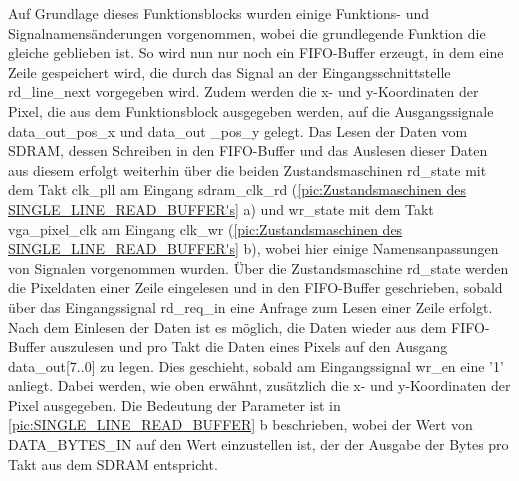 \documentclass[ngerman,12pt]{article} %
\begin{document}
{Auf Grundlage dieses Funktionsblocks wurden einige Funktions- und Signalnamensänderungen vorgenommen, wobei die grundlegende Funktion die gleiche geblieben ist. So wird nun nur noch ein FIFO-Buffer erzeugt, in dem eine Zeile gespeichert wird, die durch das Signal an der Eingangsschnittstelle rd\_line\_next vorgegeben wird. Zudem werden die x- und y-Koordinaten der Pixel, die aus dem Funktionsblock ausgegeben werden, auf die Ausgangssignale data\_out\_pos\_x und data\_out \_pos\_y gelegt. Das Lesen der Daten vom SDRAM, dessen Schreiben in den FIFO-Buffer und das Auslesen dieser Daten aus diesem erfolgt weiterhin über die beiden Zustandsmaschinen rd\_state mit dem Takt clk\_pll am Eingang sdram\_clk\_rd (\autoref{pic:Zustandsmaschinen des SINGLE_LINE_READ_BUFFER's} a) und wr\_state mit dem Takt vga\_pixel\_clk am Eingang clk\_wr (\autoref{pic:Zustandsmaschinen des SINGLE_LINE_READ_BUFFER's} b), wobei hier einige Namensanpassungen von Signalen vorgenommen wurden. Über die Zustandsmaschine rd\_state werden die Pixeldaten einer Zeile eingelesen und in den FIFO-Buffer geschrieben, sobald über das Eingangssignal rd\_req\_in eine Anfrage zum Lesen einer Zeile erfolgt. Nach dem Einlesen der Daten ist es möglich, die Daten wieder aus dem FIFO-Buffer auszulesen und pro Takt die Daten eines Pixels auf den Ausgang data\_out[7..0] zu legen. Dies geschieht, sobald am Eingangssignal wr\_en eine '1' anliegt. Dabei werden, wie oben erwähnt, zusätzlich die x- und y-Koordinaten der Pixel ausgegeben. Die Bedeutung der Parameter ist in \autoref{pic:SINGLE_LINE_READ_BUFFER} b beschrieben, wobei der Wert von DATA\_BYTES\_IN auf den Wert einzustellen ist, der der Ausgabe der Bytes pro Takt aus dem SDRAM entspricht.\newline

}
\end{document}
